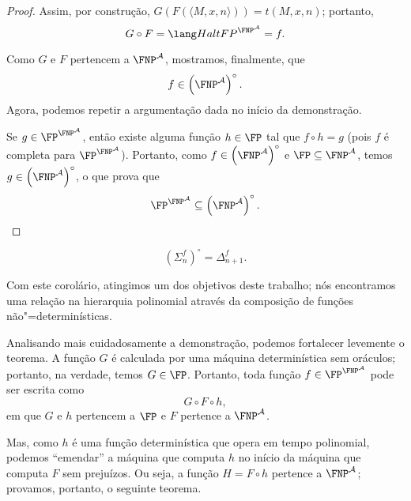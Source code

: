 \begin{proof}
    Assim, por construção, $G(F(\langle M, x, n \rangle)) = t(M, x, n)$;
    portanto,
    \begin{equation*}
        G \circ F = \HaltFP^{\FNP^\mathcal A} = f.
    \end{equation*}

    Como $G$ e $F$ pertencem a $\FNP^\mathcal A$,
    mostramos, finalmente, que
    \begin{equation*}
        f \in \left(\FNP^\mathcal A\right) ^ \circ.
    \end{equation*}
    Agora, podemos repetir a argumentação dada no início da demonstração.

    Se $g \in \FP^{\FNP^\mathcal A}$,
    então existe alguma função $h \in \FP$
    tal que $f \circ h = g$
    (pois $f$ é completa para $\FP^{\FNP^\mathcal A}$).
    Portanto,
    como $f \in \left( \FNP^\mathcal A \right) ^ \circ$
    e $\FP \subseteq \FNP^\mathcal A$,
    temos $g \in \left( \FNP^\mathcal A \right) ^ \circ$,
    o que prova que
    \begin{equation*}
        \FP^{\FNP^\mathcal A} \subseteq \left( \FNP^\mathcal A \right) ^ \circ.
    \end{equation*}
\end{proof}

\begin{ucorollary}
    \begin{equation*}
        (\Sigma_n^f) ^ \circ = \Delta_{n+1}^f.
    \end{equation*}
\end{ucorollary}

Com este corolário,
atingimos um dos objetivos deste trabalho;
nós encontramos uma relação na hierarquia polinomial
através da composição de funções não"=determinísticas.

Analisando mais cuidadosamente a demonstração,
podemos fortalecer levemente o teorema.
A função $G$ é calculada por uma máquina determinística sem oráculos;
portanto, na verdade,
temos $G \in \FP$.
Portanto, toda função $f \in \FP^{\FNP^\mathcal A}$
pode ser escrita como
\begin{equation*}
    G \circ F \circ h,
\end{equation*}
em que $G$ e $h$ pertencem a $\FP$ e $F$ pertence a $\FNP^\mathcal A$.

Mas, como $h$ é uma função determinística que opera em tempo polinomial,
podemos ``emendar'' a máquina que computa $h$
no início da máquina que computa $F$ sem prejuízos.
Ou seja,
a função $H = F \circ h$ pertence a $\FNP^\mathcal A$;
provamos, portanto,
o seguinte teorema.

